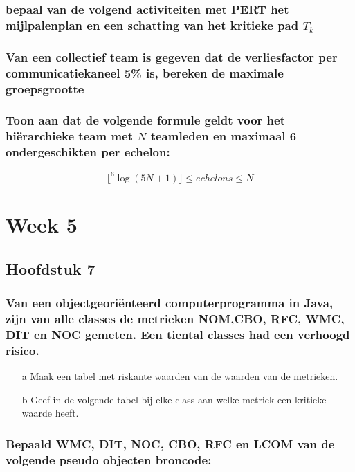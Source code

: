 \documentclass[a4paper,titlepage]{artikel1}
\begin{document}
   \subsubsection[Opdracht 2]{bepaal van de volgend activiteiten met PERT het mijlpalenplan en een schatting van het kritieke pad $T_k$}

   \subsubsection[Opdracht 3]{Van een collectief team is gegeven dat de verliesfactor per communicatiekaneel 5\% is, bereken de maximale groepsgrootte}

   \subsubsection[Opdracht 4]{Toon aan dat de volgende formule geldt voor het hi\"{e}rarchieke team met $N$ teamleden en maximaal 6 ondergeschikten per echelon:}
   \begin{displaymath}
     \lfloor^6\log{(5N+1)}\rfloor\leq echelons\leq N
   \end{displaymath}

   \section{Week 5}
   \subsection{Hoofdstuk 7}
   \subsubsection[Opdracht 1]{Van een objectgeori\"{e}nteerd computerprogramma in Java, zijn van alle classes de metrieken NOM,CBO, RFC, WMC, DIT en NOC gemeten. Een tiental classes had een verhoogd risico.}
   \begin{itemize}
     \item[a] Maak een tabel met riskante waarden van de waarden van de metrieken.
     \item[b] Geef in de volgende tabel bij elke class aan welke metriek een kritieke waarde heeft.
   \end{itemize}
   
   \subsubsection[Opdracht 2]{Bepaald WMC, DIT, NOC, CBO, RFC en LCOM van de volgende pseudo objecten broncode:}

   
   
\end{document}
